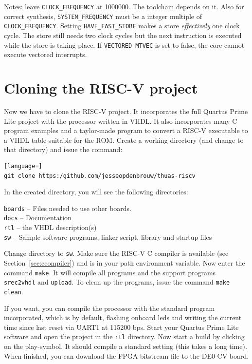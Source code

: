 \documentclass[12pt]{article}
\begin{document}
Notes: leave \lstinline|CLOCK_FREQUENCY| at 1000000. The toolchain depends on it. Also for correct synthesis, \lstinline|SYSTEM_FREQUENCY| must be a integer multiple of \lstinline|CLOCK_FREQUENCY|.
Setting \lstinline|HAVE_FAST_STORE| makes a store \emph{effectively} one clock cycle. The store still needs two clock cycles but the next instruction is executed while the store is taking place. If \lstinline|VECTORED_MTVEC| is set to false, the core cannot execute vectored interrupts.

\section{Cloning the RISC-V project}
\label{sec:cloning}
Now we have to clone the RISC-V project. It incorporates the full Quartus Prime Lite project with the processor written in VHDL. It also incorporates many C program examples and a taylor-made program to convert a RISC-V executable to a VHDL table suitable for the ROM. Create a working directory (and change to that directory) and issue the command:

\begin{lstlisting}[language=]
git clone https:/github.com/jesseopdenbrouw/thuas-riscv
\end{lstlisting}

In the created directory, you will see the following directories:

\lstinline|boards| -- Files needed to use other boards.\\
\lstinline|docs| -- Documentation \\
\lstinline|rtl| -- the VHDL description(s)\\
\lstinline|sw| -- Sample software programs, linker script, library and startup files

Change directory to \lstinline|sw|. Make sure the RISC-V C compiler is available (see Section~\ref{sec:ccompiler}) and is in your path environment variable. Now enter the command \lstinline|make|. It will compile all programs and the support programs \lstinline|srec2vhdl| and \lstinline|upload|. To clean up the programs, issue the command \lstinline|make clean|.

If you want, you can compile the processor with the standard program incorporated, which is by default, flashing onboard leds and writing the current time since last reset via UART1 at 115200 bps. Start your Quartus Prime Lite software and open the project in the \lstinline|rtl| directory. Now start a build by clicking on the play-symbol. It should compile a standard setting (this takes a long time). When finished, you can download the FPGA bitstream file to the DE0-CV board.
\end{document}

